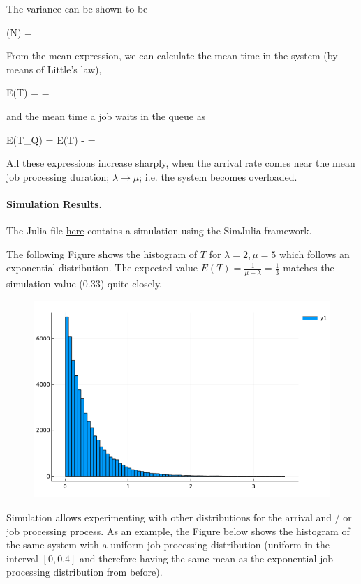 The variance can be shown to be

\bee
{}(N) = 
\eee

From the mean expression, we can calculate the mean time in the system (by means of Little's law),

\bee
E(T) =  = 
\eee

and the mean time a job waits in the queue as

\bee
E(T_Q) = E(T) -  = \frac{\rho}{\mu - \lambda}
\eee

All these expressions increase sharply, when the arrival rate comes near the mean job processing duration; $\lambda \rightarrow \mu$; i.e. the system becomes overloaded.

\paragraph{Simulation Results.} The Julia file \href{https://github.com/ClemensFMN/JuliaStuff/blob/master/SimJulia/simple_queue.jl}{here} contains a simulation using the SimJulia framework.

The following Figure shows the histogram of $T$ for $\lambda=2, \mu=5 $ which follows an exponential distribution. The expected value $E(T)=\frac{1}{\mu - \lambda} = \frac{1}{3}$ matches the simulation value ($0.33$) quite closely.

\begin{figure}[hbt!]
\centering
\includegraphics[scale=0.5]{images/queuing_3_1.png}
\end{figure}

Simulation allows experimenting with other distributions for the arrival and / or job processing process. As an example, the Figure below shows the histogram of the same system with a uniform job processing distribution (uniform in the interval $[0,0.4]$ and therefore having the same mean as the exponential job processing distribution from before).


